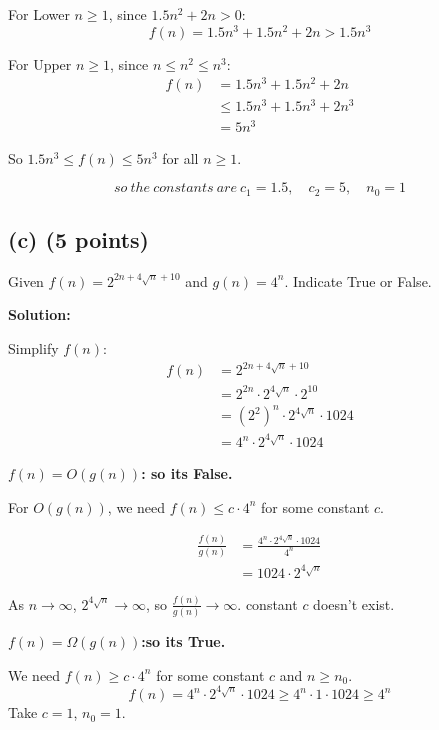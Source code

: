 \documentclass[11pt]{article}
\begin{document}
For Lower $n \ge 1$, since $1.5n^2 + 2n > 0$:
\[ f(n) = 1.5n^3 + 1.5n^2 + 2n > 1.5n^3 \]

For Upper $n \ge 1$, since $n \le n^2 \le n^3$:
\begin{align*}
f(n) &= 1.5n^3 + 1.5n^2 + 2n \\
&\le 1.5n^3 + 1.5n^3 + 2n^3 \\
&= 5n^3
\end{align*}

So $1.5n^3 \le f(n) \le 5n^3$ for all $n \ge 1$.

\[  so \ the \ constants \ are \ \boxed{c_1 = 1.5, \quad c_2 = 5, \quad n_0 = 1} \]

\subsection*{(c) (5 points)}
Given $f(n)=2^{2n+4\sqrt{n}+10}$ and $g(n)=4^{n}$. Indicate True or False.

\textbf{Solution:}

Simplify $f(n)$:
\begin{align*}
f(n) &= 2^{2n+4\sqrt{n}+10} \\
&= 2^{2n} \cdot 2^{4\sqrt{n}} \cdot 2^{10} \\
&= (2^2)^n \cdot 2^{4\sqrt{n}} \cdot 1024 \\
&= 4^n \cdot 2^{4\sqrt{n}} \cdot 1024
\end{align*}

\textbf{$f(n)=O(g(n))$: so its False.}


For $O(g(n))$, we need $f(n) \le c \cdot 4^n$ for some constant $c$.

\begin{align*}
\frac{f(n)}{g(n)} &= \frac{4^n \cdot 2^{4\sqrt{n}} \cdot 1024}{4^n} \\[6pt]
                   &= 1024 \cdot 2^{4\sqrt{n}}
\end{align*}

As $n \to \infty$, $2^{4\sqrt{n}} \to \infty$, so $\frac{f(n)}{g(n)} \to \infty$.  constant $c$ doesn't exist.

\bigskip

\textbf{$f(n)=\Omega(g(n))$:so its True.}

\medskip

We need $f(n) \ge c \cdot 4^n$ for some constant $c$ and $n \ge n_0$.
\[
  f(n) = 4^n \cdot 2^{4\sqrt{n}} \cdot 1024 \ge 4^n \cdot 1 \cdot 1024 \ge 4^n
\]
Take $c = 1$, $n_0 = 1$.

\bigskip
\end{document}
